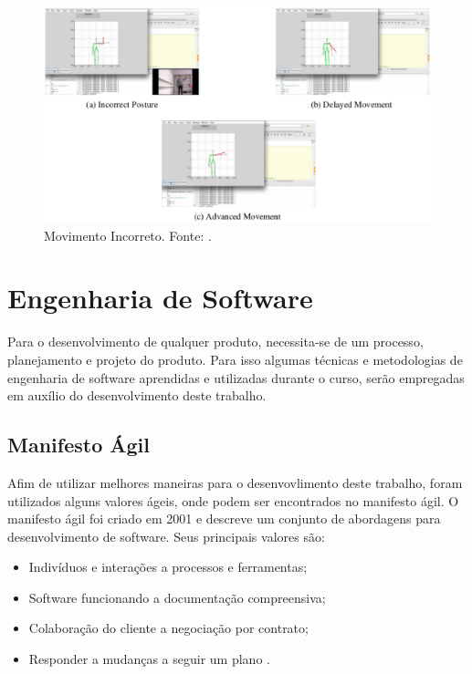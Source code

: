 \begin{figure}[H]
\centering
\includegraphics [keepaspectratio=true,scale=0.60]{figuras/movimentoIncorreto.eps}

\caption{Movimento Incorreto. Fonte: \cite{roberto}.}
\label{movimentoIncorreto}
\end{figure}

\section{Engenharia de Software}\label{sec:engenhariaSoft}
  Para o desenvolvimento de qualquer produto, necessita-se de um processo,
planejamento e projeto do produto. Para isso algumas técnicas e metodologias de
engenharia de software  aprendidas e utilizadas durante o curso, serão empregadas em
auxílio do desenvolvimento deste trabalho.
\subsection{Manifesto Ágil}
\label{sec:Manifesto Ágil}
  Afim de utilizar melhores maneiras para o desenvovlimento deste trabalho, foram utilizados alguns valores ágeis, onde podem ser encontrados
  no manifesto ágil. O manifesto ágil foi criado em 2001 e descreve um conjunto de abordagens para
desenvolvimento de software. Seus principais valores são:
  \begin{itemize}
  \item Indivíduos e interações a processos e ferramentas;
  \item Software funcionando a documentação compreensiva;
  \item Colaboração do cliente a negociação por contrato;
  \item Responder a mudanças a seguir um plano \cite{manifestoAgil}.
  \end{itemize}


